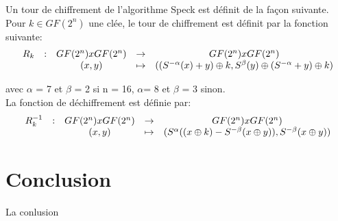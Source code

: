 			Un tour de chiffrement de l'algorithme Speck est définit de la façon suivante. \\
			Pour $k \in GF(2^n)$ une clée, le tour de chiffrement est définit par la fonction suivante:
			\[
			\begin{array}{ccccc}
			R_k & : & GF(2^n) x GF(2^n) & \to & GF(2^n) x GF(2^n) \\
			 & & (x,y) & \mapsto & ((S^{-\alpha}(x) + y) \mathbin{\oplus} k, S^\beta (y) \mathbin{\oplus} (S^{-\alpha} + y) \mathbin{\oplus} k) \\
			\end{array}
			\]

			avec $\alpha$ = 7 et $\beta$ = 2 si n = 16, $\alpha $= 8 et $\beta$ = 3 sinon. \\

			La fonction de déchiffrement est définie par:
			\[
			\begin{array}{ccccc}
			R_k^{-1} & : & GF(2^n) x GF(2^n) & \to & GF(2^n) x GF(2^n) \\
			 & & (x,y) & \mapsto & (S^\alpha ((x \mathbin{\oplus} k) - S^{-\beta}(x \mathbin{\oplus} y)), S^{-\beta}(x \mathbin{\oplus} y)) \\
			\end{array}
			\]


\newpage
\part*{Conclusion}

		La conlusion
